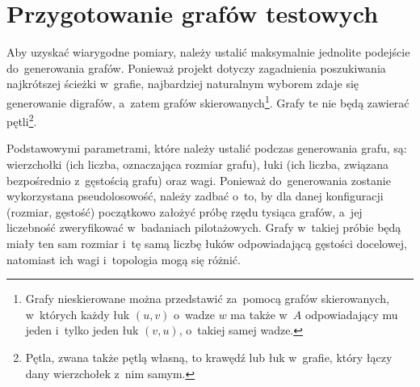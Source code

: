 \documentclass[11pt,a4paper,oneside]{report}
\begin{document}


\section{Przygotowanie grafów testowych}

\begin{center}
\end{center}

Aby uzyskać wiarygodne pomiary, należy ustalić maksymalnie jednolite podejście do~generowania grafów. Ponieważ projekt dotyczy zagadnienia poszukiwania najkrótszej ścieżki w~grafie, najbardziej naturalnym wyborem zdaje się generowanie digrafów, a~zatem grafów skierowanych\footnote{Grafy nieskierowane można przedstawić za~pomocą grafów skierowanych, w~których każdy łuk $(u, v)$ o~wadze $w$ ma także w~$A$ odpowiadający mu jeden i~tylko jeden łuk $(v, u)$, o~takiej samej wadze.}. Grafy te nie będą zawierać pętli\footnote{Pętla, zwana także pętlą własną, to krawędź lub łuk w~grafie, który łączy dany wierzchołek z~nim samym.}.

Podstawowymi parametrami, które należy ustalić podczas generowania grafu, są: wierzchołki (ich liczba, oznaczająca rozmiar grafu), łuki (ich liczba, związana bezpośrednio z~gęstością grafu) oraz wagi. Ponieważ do~generowania zostanie wykorzystana pseudolosowość, należy zadbać o~to, by dla danej konfiguracji (rozmiar, gęstość) początkowo założyć próbę rzędu tysiąca grafów, a~jej liczebność zweryfikować w~badaniach pilotażowych. Grafy w~takiej próbie będą miały ten sam rozmiar i~tę samą liczbę łuków odpowiadającą gęstości docelowej, natomiast ich wagi i~topologia mogą się różnić.
\end{document}
